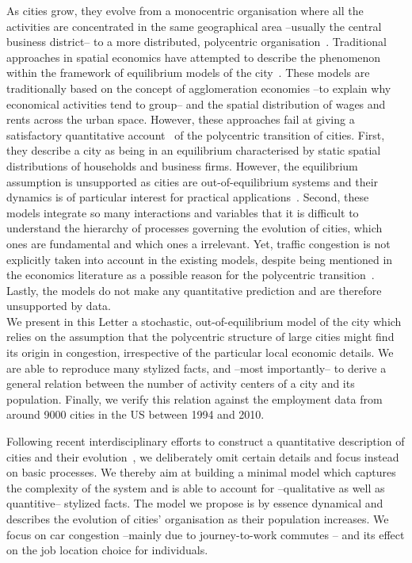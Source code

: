 As cities grow, they evolve from a monocentric organisation where all
the activities are concentrated in the same geographical area
--usually the central business district-- to a more distributed,
polycentric organisation~\cite{Kemper:1974,Odland:1978,Mills:1972,Griffith_PG:1981,Dokmeci:1994,McMillen:2003,Pereira:2013,Roth:2011}. Traditional
approaches in spatial economics have attempted to describe the
phenomenon within the framework of equilibrium models of the city~\cite{Fujita:1982,Fujita:book1999}. These models are traditionally
based on the concept of agglomeration economies --to explain why
economical activities tend to group-- and the spatial distribution of
wages and rents across the urban space. However, these approaches fail
at giving a satisfactory quantitative
account~\cite{Bouchaud:2008,Batty:2008} of the polycentric transition
of cities. First, they describe a city as being in an equilibrium
characterised by static spatial distributions of households and business
firms. However, the equilibrium assumption is unsupported as cities
are out-of-equilibrium systems and their
dynamics is of particular interest for practical
applications~\cite{Batty:2008}. Second, these models integrate so many
interactions and variables that it is difficult to understand the
hierarchy of processes governing the evolution of cities, which ones are fundamental and which ones a irrelevant. Yet, traffic congestion is not
explicitly taken into account in the existing models, despite being
mentioned in the economics literature as a possible reason for the
polycentric transition~\cite{McMillen:2003}. Lastly, the models do
not make any quantitative prediction and are therefore unsupported by
data.\\ 
We present in this Letter a stochastic, out-of-equilibrium model of the
city which relies on the assumption that the polycentric structure of
large cities might find its origin in congestion, irrespective of the
particular local economic details. We are able to reproduce many
stylized facts, and --most importantly-- to derive a general relation
between the number of activity centers of a city and its
population. Finally, we verify this relation against the employment
data from around 9000 cities in the US between 1994 and 2010.


Following recent interdisciplinary efforts to construct a quantitative
description of cities and their
evolution~\cite{Makse:1995,Zanette:1997,Marsili:1998a,Marsili:1998b,Batty:book2005,Bettencourt:2007,Batty:2008},
we deliberately omit certain details and focus instead on basic
processes. We thereby aim at building a minimal model which captures
the complexity of the system and is able to account for --qualitative as well as quantitive-- stylized
facts. The model we propose is by essence dynamical and describes the
evolution of cities' organisation as their population increases. We
focus on car congestion --mainly due to journey-to-work commutes --
and its effect on the job location choice for individuals.

